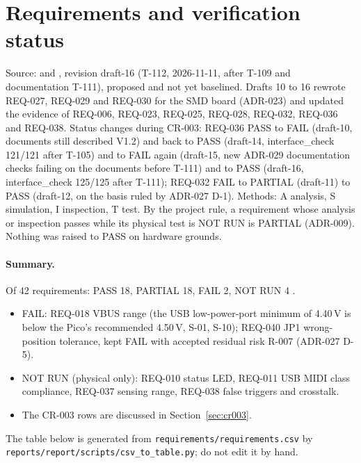\section{Requirements and verification status}
\label{sec:requirements}

Source:  and ,
revision draft-16 (T-112, 2026-11-11, after T-109 and documentation T-111),
proposed and not yet baselined. Drafts 10 to 16 rewrote REQ-027, REQ-029
and REQ-030 for the SMD board (ADR-023) and updated the evidence of REQ-006,
REQ-023, REQ-025, REQ-028, REQ-032, REQ-036 and REQ-038. Status changes during
CR-003: REQ-036 PASS to FAIL (draft-10, documents still described V1.2) and back to
PASS (draft-14, interface\_check 121/121 after T-105) and to FAIL again (draft-15,
new ADR-029 documentation checks failing on the documents before T-111) and to
PASS (draft-16, interface\_check 125/125 after T-111); REQ-032 FAIL to PARTIAL
(draft-11) to PASS (draft-12, on the basis ruled by ADR-027 D-1).
Methods: A analysis, S simulation, I inspection, T test. By the project rule, a
requirement whose analysis or inspection passes while its physical test is NOT RUN
is PARTIAL (ADR-009). Nothing was raised to PASS on hardware grounds.

\paragraph{Summary.} Of 42 requirements: PASS 18, PARTIAL 18, FAIL 2, NOT RUN 4
.
\begin{itemize}[noitemsep]
  \item FAIL: REQ-018 VBUS range (the USB low-power-port minimum of 4.40\,V is below
        the Pico's recommended 4.50\,V,  S-01, S-10); REQ-040 JP1
        wrong-position tolerance, kept FAIL with accepted residual risk R-007
        (ADR-027 D-5).
  \item NOT RUN (physical only): REQ-010 status LED, REQ-011 USB MIDI class
        compliance, REQ-037 sensing range, REQ-038 false triggers and crosstalk.
  \item The CR-003 rows are discussed in Section~\ref{sec:cr003}.
\end{itemize}

The table below is generated from \nolinkurl{requirements/requirements.csv} by
\nolinkurl{reports/report/scripts/csv_to_table.py}; do not edit it by hand.

